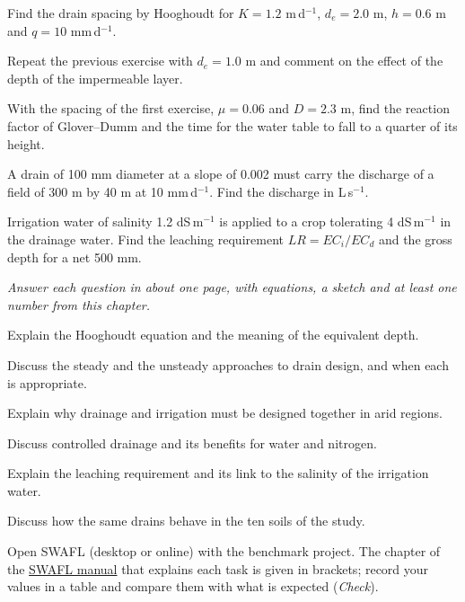 \begin{exlist}
\item Find the drain spacing by Hooghoudt for $K=1.2$ m\,d$^{-1}$, $d_e=2.0$ m, $h=0.6$ m and $q=10$ mm\,d$^{-1}$.
\item Repeat the previous exercise with $d_e=1.0$ m and comment on the effect of the depth of the impermeable layer.
\item With the spacing of the first exercise, $\mu=0.06$ and $D=2.3$ m, find the reaction factor of Glover--Dumm and the time for the water table to fall to a quarter of its height.
\item A drain of 100 mm diameter at a slope of 0.002 must carry the discharge of a field of 300 m by 40 m at 10 mm\,d$^{-1}$. Find the discharge in L\,s$^{-1}$.
\item Irrigation water of salinity 1.2 dS\,m$^{-1}$ is applied to a crop tolerating 4 dS\,m$^{-1}$ in the drainage water. Find the leaching requirement $LR=EC_i/EC_d$ and the gross depth for a net 500 mm.
\end{exlist}
{\small\itshape Answer each question in about one page, with equations, a sketch and at least one number from this chapter.}\par\vspace{3pt}
\begin{exlist}
\item Explain the Hooghoudt equation and the meaning of the equivalent depth.
\item Discuss the steady and the unsteady approaches to drain design, and when each is appropriate.
\item Explain why drainage and irrigation must be designed together in arid regions.
\item Discuss controlled drainage and its benefits for water and nitrogen.
\item Explain the leaching requirement and its link to the salinity of the irrigation water.
\item Discuss how the same drains behave in the ten soils of the study.
\end{exlist}
{\small Open SWAFL (desktop or online) with the benchmark project. The chapter of the \href{https://github.com/halilunaziru73-creator/Coupled-Water-Fluxes-Pore-Scale-Dynamics-Precision-Irrigation-Mulching-Feedback-Loops/raw/main/Software/v1.1.0/SWAFL_Desktop/docs/manual_v1.1.0/SWAFL_Manual_v1.1.0.pdf}{SWAFL manual} that explains each task is given in brackets; record your values in a table and compare them with what is expected (\emph{Check}).}\par\vspace{3pt}

